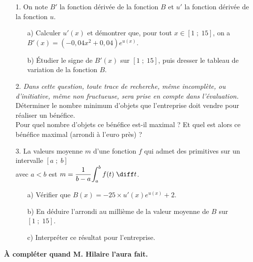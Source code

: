 \begin{itemize}
\item[1.] On note $B'$ la fonction dérivée de la fonction $B$ et $u'$ la fonction dérivée de la fonction $u$. \\

\begin{itemize}
\item[a)] Calculer $u'(x)$ et démontrer que, pour tout $x \in \left[1 \; ; \; 15\right]$, on a $B'(x) = \left(-0,04x^2 + 0,04\right)e^{u(x)}$. \\

\item[b)] Étudier le signe de $B'(x)$ sur $\left[1 \; ; \; 15\right]$, puis dresser le tableau de variation de la fonction $B$. \\
\end{itemize}

\item[2.] \textit{Dans cette question, toute trace de recherche, même incomplète, ou d'initiative, même non fructueuse, sera prise en compte dans l'évaluation.} \\
Déterminer le nombre minimum d'objets que l'entreprise doit vendre pour réaliser un bénéfice. \\
Pour quel nombre d'objets ce bénéfice est-il maximal ? Et quel est alors ce bénéfice maximal (arrondi à l'euro près) ? \\

\item[3.] La valeurs moyenne $m$ d'une fonction $f$ qui admet des primitives sur un intervalle $\left[a \; ; \; b\right]$ \\ avec $a < b$ est $m = \dfrac{1}{b-a}\displaystyle{\int_a^b f(t) \; \diff t}$. \\

\begin{itemize}
\item[a)] Vérifier que $B(x) = -25\times u'(x)e^{u(x)} + 2$. \\

\item[b)] En déduire l'arrondi au millième de la valeur moyenne de $B$ sur $\left[1 \; ; \; 15\right]$. \\

\item[c)] Interpréter ce résultat pour l'entreprise.
\end{itemize}
\end{itemize}

\vspace*{.3cm}


\textbf{À compléter quand M. Hilaire l'aura fait.}

\newpage


\ifdefined\COMPLETE
\else
    
\fi